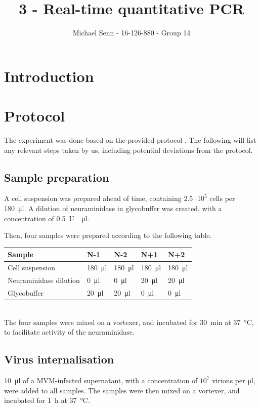 \documentclass[a4paper,english]{scrreprt}
\title{3 - Real-time quantitative PCR}
\author{Michael Senn \maillink{michael.senn@students.unibe.ch} - 16-126-880 - Group 14}
\date{\printdate}
\begin{document}
\maketitle

\chapter{Introduction}

\chapter{Protocol}

The experiment was done based on the provided protocol \cite{skriptv3}. The
following will list any relevant steps taken by us, including potential
deviations from the protocol.

\section{Sample preparation}

A cell suspension was prepared ahead of time, containing $2.5 \cdot 10^5$ cells
per \SI{180}{\ul}. A dilution of neuraminidase in glycobuffer was created, with
a concentration of \SI{0.5}{U \per \ul}.

Then, four samples were prepared according to the following table.
\\

\begin{tabu}{lllll}
	\toprule
	Sample & N-1 & N-2 & N+1 & N+2 \\
	\midrule
	Cell suspension & \SI{180}{\ul} & \SI{180}{\ul} & \SI{180}{\ul} & \SI{180}{\ul} \\
	Neuraminidase dilution & \SI{0}{\ul} & \SI{0}{\ul} & \SI{20}{\ul} & \SI{20}{\ul} \\
	Glycobuffer & \SI{20}{\ul} & \SI{20}{\ul} & \SI{0}{\ul} & \SI{0}{\ul} \\
	\bottomrule
\end{tabu}
\\

The four samples were mixed on a vortexer, and incubated for \SI{30}{\minute}
at \SI{37}{\celsius}, to facilitate activity of the neuraminidase.

\section{Virus internalisation}

\SI{10}{\ul} of a MVM-infected supernatant, with a concentration of $10^7$
virions per \si{\ul}, were added to all samples. The samples were then mixed on
a vortexer, and incubated for \SI{1}{\hour} at \SI{37}{\celsius}.
\end{document}

